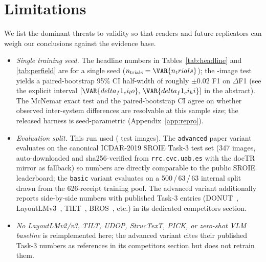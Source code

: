 \section{Limitations}
\label{sec:limitations}

We list the dominant threats to validity so that readers and future
replicators can weigh our conclusions against the evidence base.

\begin{itemize}
  \item \emph{Single training seed.}  The headline numbers in
        Tables~\ref{tab:headline} and \ref{tab:perfield} are for a
        single seed ($n_{\text{trials}}=\VAR{n_trials}$); the
        -image test yields a paired-bootstrap 95\%
        CI half-width of roughly $\pm 0.02$ F1 on $\Delta$F1 (see the
        explicit interval $[\VAR{delta_f1_ci_lo},\,\VAR{delta_f1_ci_hi}]$
        in the abstract).  The McNemar exact test
        and the paired-bootstrap CI agree on whether observed
        inter-system differences are resolvable at this sample size;
        the released harness is seed-parametric (Appendix~\ref{app:repro}).
  \item \emph{Evaluation split.}  This run used
         ( test images).  The
        \texttt{advanced} paper variant evaluates on the canonical
        ICDAR-2019 SROIE Task-3 test set (347 images, auto-downloaded
        and sha256-verified from \texttt{rrc.cvc.uab.es} with the
        docTR mirror as fallback) so numbers are directly comparable
        to the public SROIE leaderboard; the \texttt{basic} variant
        evaluates on a 500\,/\,63\,/\,63 internal split drawn from
        the 626-receipt training pool.  The advanced variant additionally reports
        side-by-side numbers with published Task-3 entries
        (DONUT~\cite{kim2022donut}, LayoutLMv3~\cite{huang2022layoutlmv3},
        TILT~\cite{powalski2021tilt}, BROS~\cite{hong2022bros}, etc.)
        in its dedicated competitors section.
  \item \emph{No LayoutLMv2/v3, TILT, UDOP, StrucTexT, PICK, or
        zero-shot VLM baseline} is reimplemented here; the advanced
        variant cites their published Task-3 numbers as references
        in its competitors section but does not retrain them.
\end{itemize}
